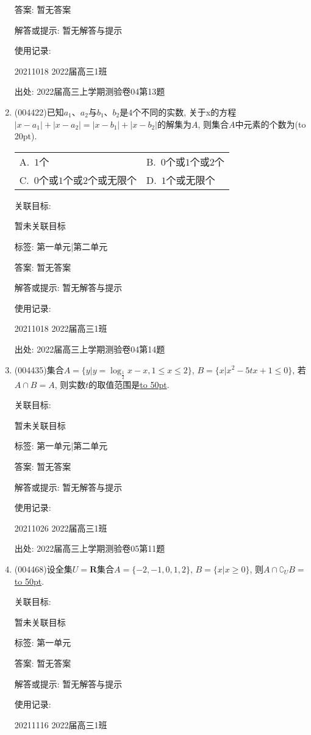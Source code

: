 \documentclass[10pt,a4paper]{article}
\newcommand{\blank}[1]{\underline{\hbox to #1pt{}}}
\newcommand{\bracket}[1]{(\hbox to #1pt{})}
\newcommand{\twoch}[4]{\par\begin{tabular}{p{.46\textwidth}p{.46\textwidth}}
A.~#1& B.~#2\\
C.~#3& D.~#4
\end{tabular}}
\begin{document}
\begin{enumerate}[1.]
答案: 暂无答案

解答或提示: 暂无解答与提示

使用记录:

20211018	2022届高三1班	


出处: 2022届高三上学期测验卷04第13题
\item { (004422)}已知$a_1$、$a_2$与$b_1$、$b_2$是$4$个不同的实数, 关于x的方程$|x-a_1|+|x-a_2|=|x-b_1|+|x-b_2|$的解集为$A$, 则集合$A$中元素的个数为\bracket{20}.
\twoch{$1$个}{$0$个或$1$个或$2$个}{$0$个或$1$个或$2$个或无限个}{$1$个或无限个}


关联目标:

暂未关联目标



标签: 第一单元|第二单元

答案: 暂无答案

解答或提示: 暂无解答与提示

使用记录:

20211018	2022届高三1班	


出处: 2022届高三上学期测验卷04第14题
\item { (004435)}集合$A=\{y|y=\log_{\frac 12}x-x,1\le x\le 2\}$, $B=\{x|x^2-5tx+1\le 0\}$, 若$A\cap B=A$, 则实数$t$的取值范围是\blank{50}.


关联目标:

暂未关联目标



标签: 第一单元|第二单元

答案: 暂无答案

解答或提示: 暂无解答与提示

使用记录:

20211026	2022届高三1班	


出处: 2022届高三上学期测验卷05第11题
\item { (004468)}设全集$U=\mathbf{R}$集合$A=\{-2,-1,0,1,2\}$, $B=\{x|x\ge 0\}$, 则$A\cap \complement_UB=$\blank{50}.


关联目标:

暂未关联目标



标签: 第一单元

答案: 暂无答案

解答或提示: 暂无解答与提示

使用记录:

20211116	2022届高三1班	



\end{enumerate}
\end{document}
